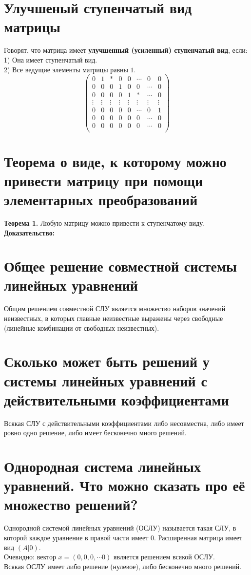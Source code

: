 \documentclass[a4paper,11pt]{report}
\begin{document}
\section{Улучшеный ступенчатый вид матрицы}
Говорят, что матрица имеет \textbf{улучшенный (усиленный) ступенчатый вид}, если:\\
1) Она имеет ступенчатый вид.\\
2) Все ведущие элементы матрицы равны $1$.\\
\[
\begin{pmatrix}
 0 & 1 & * & 0 & 0 & \cdots & 0 & 0\\
 0 & 0 & 0 & 1 & 0 & 0 & \cdots & 0\\
 0 & 0 & 0 & 0 & 1 & * & \cdots & 0\\
 \vdots & \vdots & \vdots & \vdots & \vdots & \vdots & \vdots & \vdots\\
 0 & 0 & 0 & 0 & 0 &  \cdots & 0 & 1\\
 0 & 0 & 0 & 0 & 0 & 0 & \cdots & 0\\
 0 & 0 & 0 & 0 & 0 & 0 & \cdots & 0\\
\end{pmatrix}
\]
\section{Теорема о виде, к которому можно привести матрицу при помощи элементарных преобразований}
\textbf{Теорема 1.} Любую матрицу можно привести к ступенчатому виду.\\
\textbf{Доказательство:}\\
\section{Общее решение совместной системы линейных уравнений}
Общим решением совместной СЛУ является множество наборов значений неизвестных, в которых главные неизвестные выражены 
через свободные (линейные комбинации от свободных неизвестных).
\section{Сколько может быть решений у системы линейных уравнений с действительными коэффициентами}
Всякая СЛУ с действительными коэффициентами либо несовместна, либо имеет ровно одно решение, либо имеет бесконечно много решений.
\section{Однородная система линейных уравнений. Что можно сказать про её множество решений?}
Однородной системой линейных уравнений (ОСЛУ) называется такая СЛУ, в которой каждое уравнение в правой части имеет 0.
Расширенная матрица имеет вид $(A | 0)$.\\
Очевидно: вектор $x = (0, 0, 0, \cdots 0)$ является решением всякой ОСЛУ.\\
Всякая ОСЛУ имеет либо решение (нулевое), либо бесконечно много решений.\\
\end{document}
